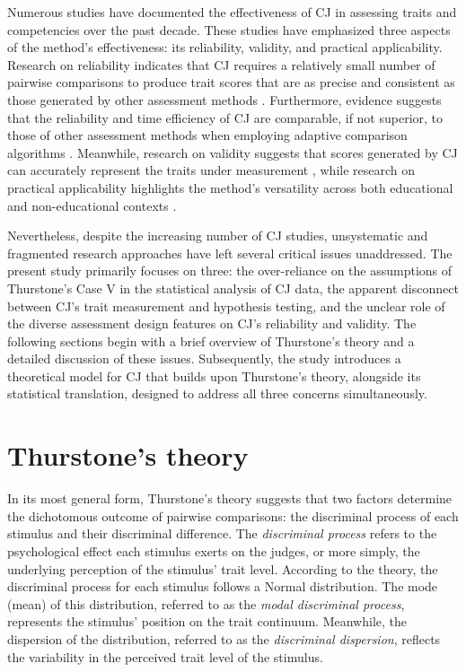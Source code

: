 \documentclass[
  authoryear,
  preprint,
  1p]{elsarticle}
\begin{document}
Numerous studies have documented the effectiveness of CJ in assessing
traits and competencies over the past decade. These studies have
emphasized three aspects of the method's effectiveness: its reliability,
validity, and practical applicability. Research on reliability indicates
that CJ requires a relatively small number of pairwise comparisons
\citep{Verhavert_et_al_2019, Crompvoets_et_al_2022} to produce trait
scores that are as precise and consistent as those generated by other
assessment methods
\citep{Coertjens_et_al_2017, Goossens_et_al_2018, Bouwer_et_al_2023}.
Furthermore, evidence suggests that the reliability and time efficiency
of CJ are comparable, if not superior, to those of other assessment
methods when employing adaptive comparison algorithms
\citep{Pollitt_2012b, Verhavert_et_al_2022, Mikhailiuk_et_al_2021}.
Meanwhile, research on validity suggests that scores generated by CJ can
accurately represent the traits under measurement
\citep{Whitehouse_2012, vanDaal_et_al_2016, Lesterhuis_2018_thesis, Bartholomew_et_al_2018, Bouwer_et_al_2023},
while research on practical applicability highlights the method's
versatility across both educational and non-educational contexts
\citep{Kimbell_2012, Jones_et_al_2015, Bartholomew_et_al_2018, Jones_et_al_2019, Marshall_et_al_2020, Bartholomew_et_al_2020, Boonen_et_al_2020}.

Nevertheless, despite the increasing number of CJ studies, unsystematic
and fragmented research approaches have left several critical issues
unaddressed. The present study primarily focuses on three: the
over-reliance on the assumptions of Thurstone's Case V in the
statistical analysis of CJ data, the apparent disconnect between CJ's
trait measurement and hypothesis testing, and the unclear role of the
diverse assessment design features on CJ's reliability and validity. The
following sections begin with a brief overview of Thurstone's theory and
a detailed discussion of these issues. Subsequently, the study
introduces a theoretical model for CJ that builds upon Thurstone's
theory, alongside its statistical translation, designed to address all
three concerns simultaneously.

\section{Thurstone's theory}\label{sec-thurstone_theory}

In its most general form, Thurstone's theory
\citeyearpar{Thurstone_1927b} suggests that two factors determine the
dichotomous outcome of pairwise comparisons: the discriminal process of
each stimulus and their discriminal difference. The \emph{discriminal
process} refers to the psychological effect each stimulus exerts on the
judges, or more simply, the underlying perception of the stimulus' trait
level. According to the theory, the discriminal process for each
stimulus follows a Normal distribution. The mode (mean) of this
distribution, referred to as the \emph{modal discriminal process},
represents the stimulus' position on the trait continuum. Meanwhile, the
dispersion of the distribution, referred to as the \emph{discriminal
dispersion}, reflects the variability in the perceived trait level of
the stimulus.
\end{document}
